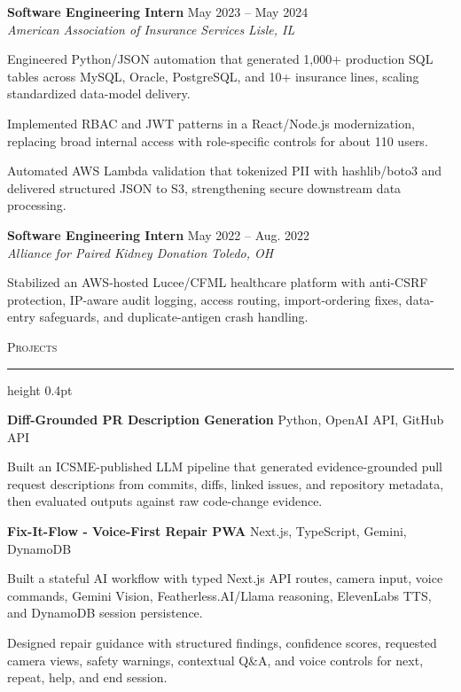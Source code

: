 \documentclass[letterpaper,11pt]{article}
\newcommand{\resumesection}[1]{%
  \par\vspace{2pt}%
  {\large\scshape #1}\par\vspace{2pt}%
  \hrule height 0.4pt\vspace{2pt}%
}
\newcommand{\resumeSubheading}[4]{
  \textbf{#1} \hfill #2\\
  \textit{#3} \hfill \textit{#4}
}
\newcommand{\projectHeading}[2]{
  \textbf{#1} \hfill #2
}
\begin{document}
\resumeSubheading
{Software Engineering Intern}{May 2023 -- May 2024}
{American Association of Insurance Services}{Lisle, IL}
\begin{tightitemize}
  \item Engineered Python/JSON automation that generated 1,000+ production SQL tables across MySQL, Oracle, PostgreSQL, and 10+ insurance lines, scaling standardized data-model delivery.
  \item Implemented RBAC and JWT patterns in a React/Node.js modernization, replacing broad internal access with role-specific controls for about 110 users.
  \item Automated AWS Lambda validation that tokenized PII with hashlib/boto3 and delivered structured JSON to S3, strengthening secure downstream data processing.
\end{tightitemize}

\resumeSubheading
{Software Engineering Intern}{May 2022 -- Aug. 2022}
{Alliance for Paired Kidney Donation}{Toledo, OH}
\begin{tightitemize}
  \item Stabilized an AWS-hosted Lucee/CFML healthcare platform with anti-CSRF protection, IP-aware audit logging, access routing, import-ordering fixes, data-entry safeguards, and duplicate-antigen crash handling.
\end{tightitemize}

\resumesection{Projects}
\projectHeading{Diff-Grounded PR Description Generation}{Python, OpenAI API, GitHub API}
\begin{tightitemize}
  \item Built an ICSME-published LLM pipeline that generated evidence-grounded pull request descriptions from commits, diffs, linked issues, and repository metadata, then evaluated outputs against raw code-change evidence.
\end{tightitemize}

\projectHeading{Fix-It-Flow - Voice-First Repair PWA}{Next.js, TypeScript, Gemini, DynamoDB}
\begin{tightitemize}
  \item Built a stateful AI workflow with typed Next.js API routes, camera input, voice commands, Gemini Vision, Featherless.AI/Llama reasoning, ElevenLabs TTS, and DynamoDB session persistence.
  \item Designed repair guidance with structured findings, confidence scores, requested camera views, safety warnings, contextual Q\&A, and voice controls for next, repeat, help, and end session.
\end{tightitemize}
\end{document}

